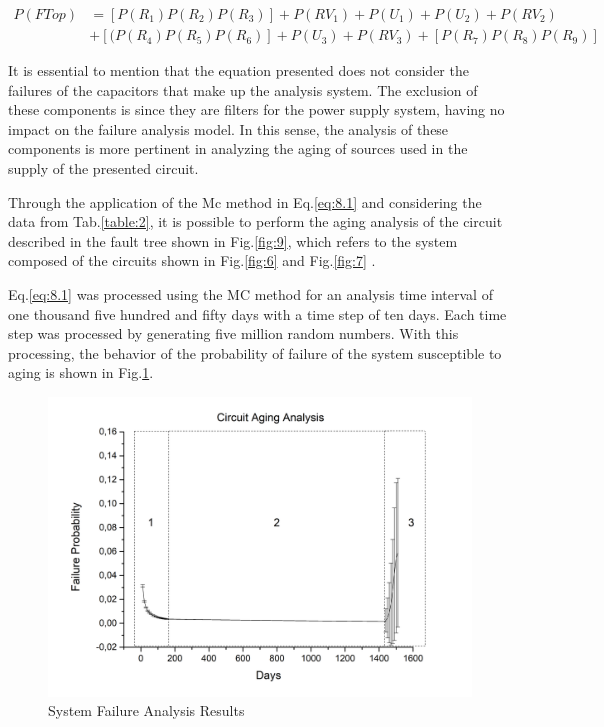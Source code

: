 \documentclass{ws-m3as}
\begin{document}
\begin{equation} \label{eq:8.1}
\begin{split}
P(FTop) & =[P(R_{1})P(R_{2})P(R_{3})]+P(RV_{1})+P(U_{1})+P(U_{2})+P(RV_{2})\\
&+[(P(R_{4})P(R_{5})P(R_{6})]+P(U_{3})+P(RV_{3})+[P(R_{7})P(R_{8})P(R_{9})]
\end{split}
\end{equation}
\hspace{2pt}

It is essential to mention that the equation presented does not consider the failures of the capacitors that make up the analysis system. The exclusion of these components is since they are filters for the power supply system, having no impact on the failure analysis model. In this sense, the analysis of these components is more pertinent in analyzing the aging of sources used in the supply of the presented circuit. 

Through the application of the Mc method in Eq.\ref{eq:8.1} and considering the data from Tab.\ref{table:2}, it is possible to perform the aging analysis of the circuit described in the fault tree shown in Fig.\ref{fig:9}, which refers to the system composed of the circuits shown in Fig.\ref{fig:6} and Fig.\ref{fig:7} . 

Eq.\ref{eq:8.1} was processed using the MC method for an analysis time interval of one thousand five hundred and fifty days with a time step of ten days. Each time step was processed by generating five million random numbers. With this processing, the behavior of the probability of failure of the system susceptible to aging is shown in Fig.\ref{fig:10}.

\begin{figure} [H]
	\centering
	\includegraphics[width=0.75\linewidth]{"Figures/Circuit Failure Probability"}
	\caption{System Failure Analysis Results}
	\label{fig:circuit-failure-probability}
	\label{fig:10}	
\end{figure}
\end{document}
